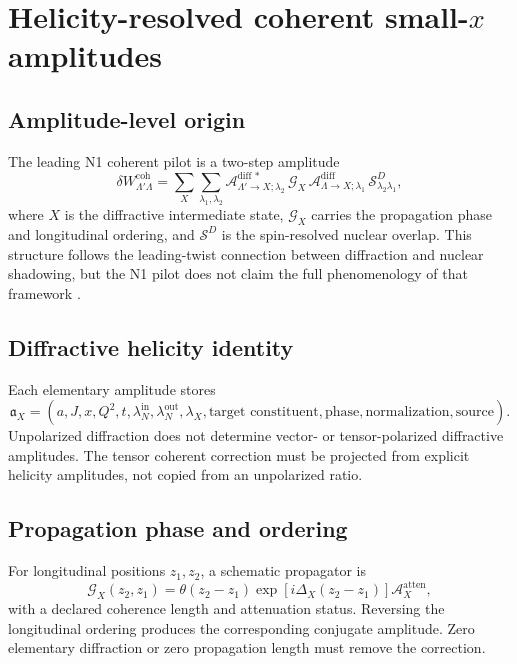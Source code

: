\documentclass[11pt]{article}
\begin{document}
\section{Helicity-resolved coherent small-\texorpdfstring{\(x\)}{x} amplitudes}
\label{sec:coherent}

\subsection{Amplitude-level origin}

The leading N1 coherent pilot is a two-step amplitude
\begin{equation}
 \delta W_{\Lambda'\Lambda}^{\mathrm{coh}}
 =
 \sum_X
 \sum_{\lambda_1,\lambda_2}
 \mathcal A_{\Lambda'\to X;\lambda_2}^{\mathrm{diff}\,*}
 \,\mathcal G_X
 \,\mathcal A_{\Lambda\to X;\lambda_1}^{\mathrm{diff}}
 \,\mathcal S_{\lambda_2\lambda_1}^{D},
 \label{eq:coherent-amplitude}
\end{equation}
where \(X\) is the diffractive intermediate state, \(\mathcal G_X\) carries
the propagation phase and longitudinal ordering, and \(\mathcal S^D\) is the
spin-resolved nuclear overlap.  This structure follows the leading-twist
connection between diffraction and nuclear shadowing, but the N1 pilot does
not claim the full phenomenology of that framework \cite{FrankfurtGuzeyStrikman2012}.

\subsection{Diffractive helicity identity}

Each elementary amplitude stores
\begin{equation}
 \mathfrak a_X=
 \left(
 a,J,x,Q^2,t,
 \lambda_N^{\mathrm{in}},\lambda_N^{\mathrm{out}},
 \lambda_X,
 \text{target constituent},
 \text{phase},
 \text{normalization},
 \text{source}
 \right).
 \label{eq:diff-amplitude-id}
\end{equation}
Unpolarized diffraction does not determine vector- or tensor-polarized
diffractive amplitudes.  The tensor coherent correction must be projected from
explicit helicity amplitudes, not copied from an unpolarized ratio.

\subsection{Propagation phase and ordering}

For longitudinal positions \(z_1,z_2\), a schematic propagator is
\begin{equation}
 \mathcal G_X(z_2,z_1)
 =\theta(z_2-z_1)
 \exp\left[i\Delta_X(z_2-z_1)\right]
 \mathcal A_X^{\mathrm{atten}},
 \label{eq:coherent-propagator}
\end{equation}
with a declared coherence length and attenuation status.  Reversing the
longitudinal ordering produces the corresponding conjugate amplitude.  Zero
elementary diffraction or zero propagation length must remove the correction.
\end{document}
